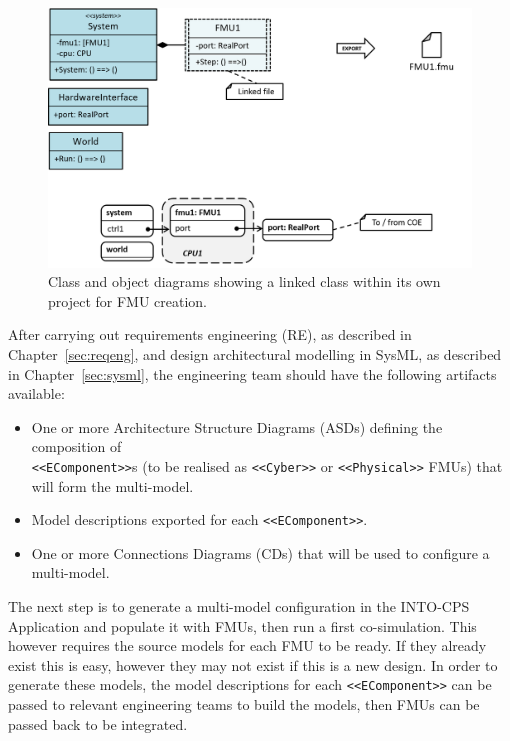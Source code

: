\begin{figure}[p]
\centering
\includegraphics[scale=0.47]{figures/defirst_fmu1}
\caption{Class and object diagrams showing a linked class within its own project for FMU creation.}
\label{fig:defirst_fmus}
\end{figure}

After carrying out requirements engineering (RE), as described in Chapter~\ref{sec:reqeng}, and design architectural modelling in SysML, as described in Chapter~\ref{sec:sysml}, the engineering team should have the following artifacts available:

\begin{itemize}[noitemsep]
\item One or more Architecture Structure Diagrams (ASDs) defining the composition of\\ \texttt{<<EComponent>>}s (to be realised as \texttt{<<Cyber>>} or \texttt{<<Physical>>} FMUs) that will form the multi-model.
\item Model descriptions exported for each \texttt{<<EComponent>>}.
\item One or more Connections Diagrams (CDs) that will be used to configure a multi-model.
\end{itemize}

The next step is to generate a multi-model configuration in the INTO-CPS Application and populate it with FMUs, then run a first co-simulation. This however requires the source models for each FMU to be ready. If they already exist this is easy, however they may not exist if this is a new design. In order to generate these models, the model descriptions for each \texttt{<<EComponent>>} can be passed to relevant engineering teams to build the models, then FMUs can be passed back to be integrated.

